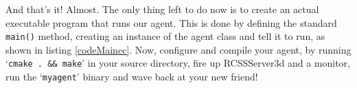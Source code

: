 And that's it! Almost. The only thing left to do now is to create an
actual executable program that runs our agent. This is done by
defining the standard {\tt main()} method, creating an instance of the
agent class and tell it to run, as shown in listing
\ref{codeMaincc}. Now, configure and compile your agent, by running
`{\tt cmake . \&\& make}' in your source directory, fire up RCSSServer3d
and a monitor, run the `{\tt myagent}' binary and wave back at your
new friend!

